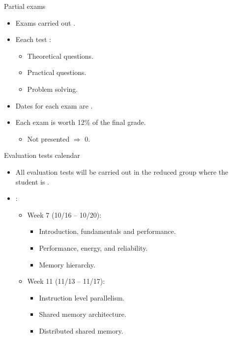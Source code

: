 \begin{frame}[t]{Partial exams}
\begin{itemize}
  \item Exams carried out .

  \item Eeach test :
    \begin{itemize}
      \item Theoretical questions.
      \item Practical questions.
      \item Problem solving.
    \end{itemize}

  \item Dates for each exam are .

  \item Each exam is worth 12\% of the final grade.
    \begin{itemize}
      \item Not presented $\Rightarrow$ 0.
    \end{itemize}
\end{itemize}
\end{frame}

\begin{frame}[t]{Evaluation tests calendar}
\begin{itemize}
  \item All evaluation tests will be carried out in the reduced group
        where the student is .

  \vfill
  \item {}:
  \begin{itemize}
    \item Week 7 (10/16 -- 10/20): 
      \begin{itemize}
        \item Introduction, fundamentals and performance.
        \item Performance, energy, and reliability.
        \item Memory hierarchy.
      \end{itemize}
    \item Week 11 (11/13 -- 11/17):
      \begin{itemize}
        \item Instruction level parallelism.
        \item Shared memory architecture.
        \item Distributed shared memory.
      \end{itemize}
  \end{itemize}
\end{itemize}
\end{frame}


